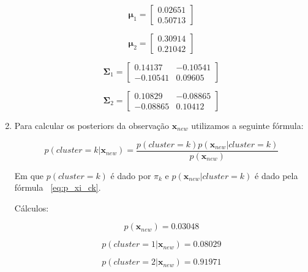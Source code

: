 \documentclass[a4paper,12pt]{article} %
\begin{document}
\begin{enumerate}
\begin{equation*}
    \boldsymbol{\mu}_1 = \begin{bmatrix}
    0.02651 \\
    0.50713
\end{bmatrix}
\end{equation*}

\begin{equation*}
    \boldsymbol{\mu}_2 = \begin{bmatrix}
    0.30914 \\
    0.21042
\end{bmatrix}
\end{equation*}

\begin{equation*}
    \boldsymbol{\Sigma}_1 = \begin{bmatrix}
    0.14137 & -0.10541 \\
    -0.10541 & 0.09605
\end{bmatrix}
\end{equation*}

\begin{equation*}
    \boldsymbol{\Sigma}_2 = \begin{bmatrix}
    0.10829 & -0.08865 \\
    -0.08865 & 0.10412
\end{bmatrix}
\end{equation*}

\item
Para calcular os posteriors da observação $\mathbf{x}_{new}$ utilizamos a 
seguinte fórmula:

\begin{equation}
    p(cluster = k|\mathbf{x}_{new}) = \frac{p(cluster = k)p(\mathbf{x}_{new}|cluster = k)}{p(\mathbf{x}_{new})}
\end{equation}

Em que $p(cluster = k)$ é dado por $\pi_k$ e $p(\mathbf{x}_{new}|cluster = k)$ é dado pela fórmula ~\eqref{eq:p_xi_ck}.

Cálculos:

\begin{equation*}
    p(\mathbf{x}_{new}) = 0.03048
\end{equation*}

\begin{equation*}
    p(cluster = 1|\mathbf{x}_{new}) = 0.08029
\end{equation*}

\begin{equation*}
    p(cluster = 2|\mathbf{x}_{new}) = 0.91971
\end{equation*}


\end{enumerate}
\end{document}
